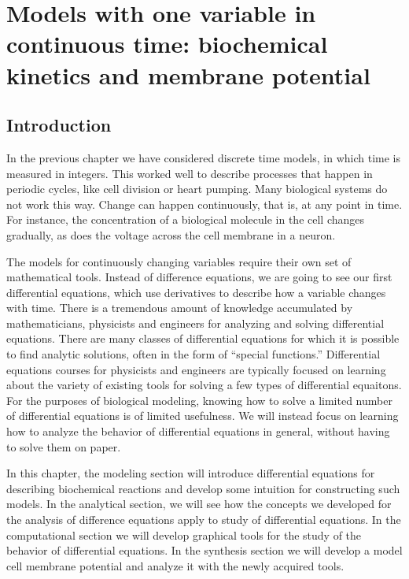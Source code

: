 \documentclass[11pt]{book}
\begin{document}
\setcounter{chapter}{1}
\chapter[One variable in continuous time]{Models with one variable in continuous time: biochemical kinetics and membrane potential}
\section{Introduction}

In the previous chapter we have considered discrete time models, in which time is measured in integers. This worked well to describe processes that happen in periodic cycles, like cell division or heart pumping. Many biological systems do not work this way. Change can happen continuously, that is, at any point in time. For instance, the concentration of a biological molecule in the cell changes gradually, as does the voltage across the cell membrane in a neuron.

The models for continuously changing variables require their own set of mathematical tools. Instead of difference equations, we are going to see our first differential equations, which use derivatives to describe how a variable changes with time. There is a tremendous amount of knowledge accumulated by mathematicians, physicists and engineers for analyzing and solving differential equations. There are many classes of differential equations for which it is possible to find analytic solutions, often in the form of ``special functions.'' Differential equations courses for physicists and engineers are typically focused on learning about the variety of existing tools for solving a few types of differential equaitons. For the purposes of biological modeling, knowing how to solve a limited number of differential equations is of limited usefulness. We will instead focus on learning how to analyze the behavior of differential equations in general, without having to solve them on paper.

In this chapter, the modeling section will introduce differential equations for describing biochemical reactions and develop some intuition for constructing such models. In the analytical section, we will see how the concepts we developed for the analysis of difference equations apply to study of differential equations. In the computational section we will develop graphical tools for the study of the behavior of differential equations. In the synthesis section we will develop a model cell membrane potential and analyze it with the newly acquired tools.
\end{document}
